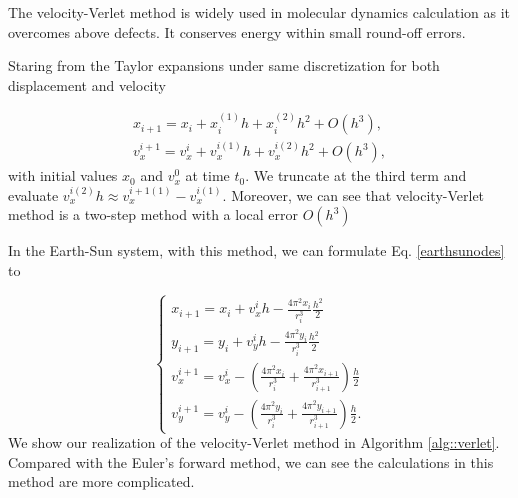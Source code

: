The velocity-Verlet method is widely used in molecular dynamics calculation as it overcomes above defects. It conserves energy within small round-off errors\cite{toxvaerd2012energy}.

Staring from the Taylor expansions under same discretization for both displacement and velocity

\begin{equation}
	\begin{aligned}
		x_{i+1} = x_i + x_i^{(1)}h + x_i^{(2)}h^2 + O(h^3),\\
		v_x^{i+1} = v_x^{i} + v_x^{i(1)}h + v_x^{i(2)}h^2 + O(h^3),
	\end{aligned}
\end{equation}
with initial values $x_0$ and $v_x^0$ at time $t_0$. We truncate at the third term and evaluate $v_x^{i(2)}h \approx v_x^{i+1(1)}-v_x^{i(1)}$. Moreover, we can see that velocity-Verlet method is a two-step method with a local error $O(h^3)$

In the Earth-Sun system, with this method, we can formulate Eq. \ref{earthsunodes} to

\begin{equation}
	\left\{  
             \begin{array}{lr}  
             	x_{i+1} = x_i + v_x^{i}h - \frac{4\pi^2x_i}{r_i^3}\frac{h^2}{2} \\
				y_{i+1} = y_i + v_y^{i}h - \frac{4\pi^2y_i}{r_i^3}\frac{h^2}{2} \\
             	v_x^{i+1} = v_x^{i} - (\frac{4\pi^2x_i}{r_i^3}+\frac{4\pi^2x_{i+1}}{r_{i+1}^3})\frac{h}{2}\\
             	v_y^{i+1} = v_y^{i} - (\frac{4\pi^2y_i}{r_i^3}+\frac{4\pi^2y_{i+1}}{r_{i+1}^3})\frac{h}{2}.
			\end{array}  
	\right.	
\end{equation} 
We show our realization of the velocity-Verlet method in Algorithm \ref{alg::verlet}. Compared with the Euler's forward method, we can see the calculations in this method are more complicated.

